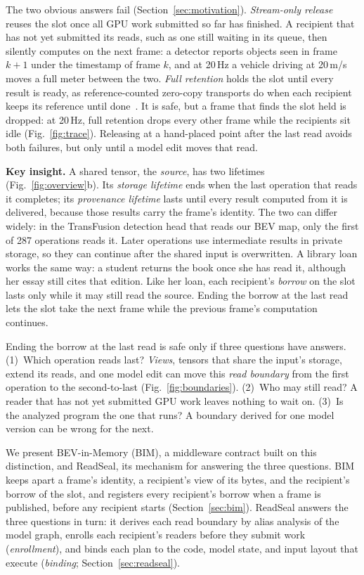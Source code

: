 \documentclass[conference]{IEEEtran}
\newcommand{\Hz}{\,Hz}
\begin{document}
The two obvious answers fail (Section~\ref{sec:motivation}). \emph{Stream-only release} reuses the slot once all GPU work submitted so far has finished. A recipient that has not yet submitted its reads, such as one still waiting in its queue, then silently computes on the next frame: a detector reports objects seen in frame $k{+}1$ under the timestamp of frame $k$, and at 20\Hz{} a vehicle driving at 20\,m/s moves a full meter between the two. \emph{Full retention} holds the slot until every result is ready, as reference-counted zero-copy transports do when each recipient keeps its reference until done~\cite{iceoryx,agnocast}. It is safe, but a frame that finds the slot held is dropped: at 20\Hz, full retention drops every other frame while the recipients sit idle (Fig.~\ref{fig:trace}). Releasing at a hand-placed point after the last read avoids both failures, but only until a model edit moves that read.

\textbf{Key insight.} A shared tensor, the \emph{source}, has two lifetimes (Fig.~\ref{fig:overview}b). Its \emph{storage lifetime} ends when the last operation that reads it completes; its \emph{provenance lifetime} lasts until every result computed from it is delivered, because those results carry the frame's identity. The two can differ widely: in the TransFusion detection head that reads our BEV map, only the first of 287 operations reads it. Later operations use intermediate results in private storage, so they can continue after the shared input is overwritten. A library loan works the same way: a student returns the book once she has read it, although her essay still cites that edition. Like her loan, each recipient's \emph{borrow} on the slot lasts only while it may still read the source. Ending the borrow at the last read lets the slot take the next frame while the previous frame's computation continues.

Ending the borrow at the last read is safe only if three questions have answers. (1)~Which operation reads last? \emph{Views}, tensors that share the input's storage, extend its reads, and one model edit can move this \emph{read boundary} from the first operation to the second-to-last (Fig.~\ref{fig:boundaries}). (2)~Who may still read? A reader that has not yet submitted GPU work leaves nothing to wait on. (3)~Is the analyzed program the one that runs? A boundary derived for one model version can be wrong for the next.

We present BEV-in-Memory (BIM), a middleware contract built on this distinction, and ReadSeal, its mechanism for answering the three questions. BIM keeps apart a frame's identity, a recipient's view of its bytes, and the recipient's borrow of the slot, and registers every recipient's borrow when a frame is published, before any recipient starts (Section~\ref{sec:bim}). ReadSeal answers the three questions in turn: it derives each read boundary by alias analysis of the model graph, enrolls each recipient's readers before they submit work (\emph{enrollment}), and binds each plan to the code, model state, and input layout that execute (\emph{binding}; Section~\ref{sec:readseal}).
\end{document}
